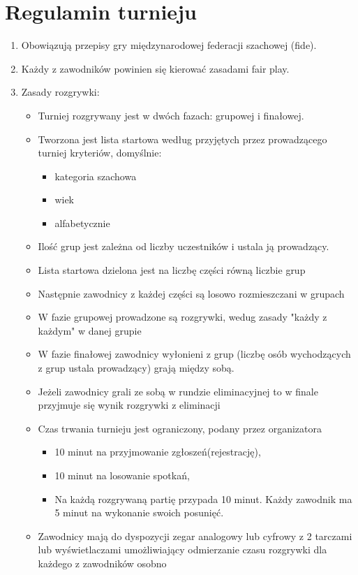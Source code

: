 \section{Regulamin turnieju}
\begin{enumerate}
\item Obowiązują przepisy gry międzynarodowej federacji szachowej (fide).
\item Każdy z zawodników powinien się kierować zasadami fair play.
\item Zasady rozgrywki:
\begin{itemize}
\item Turniej rozgrywany jest w dwóch fazach: grupowej i finałowej.\\
\item Tworzona jest lista startowa według przyjętych przez prowadzącego turniej kryteriów, domyślnie:
\begin{itemize}
\item kategoria szachowa 
\item wiek
\item alfabetycznie
\end{itemize}
\item Ilość grup jest zależna od liczby uczestników i ustala ją prowadzący.
\item Lista startowa dzielona jest na liczbę części równą liczbie grup
\item Następnie zawodnicy z każdej części są losowo rozmieszczani w grupach
\item W fazie grupowej prowadzone są rozgrywki, wedug zasady "każdy z każdym" w danej grupie
\item W fazie finałowej zawodnicy wyłonieni z grup (liczbę osób wychodzących z grup ustala prowadzący) grają między sobą.
\item Jeżeli zawodnicy grali ze sobą w rundzie eliminacyjnej to w finale przyjmuje się wynik rozgrywki z eliminacji
\item Czas trwania turnieju jest ograniczony, podany przez organizatora
\begin{itemize}
\item 10 minut na przyjmowanie zgłoszeń(rejestrację),
\item 10 minut na losowanie spotkań,
\item Na każdą rozgrywaną partię przypada 10 minut. Każdy zawodnik ma 5 minut na wykonanie swoich posunięć.
\end{itemize}
\item Zawodnicy mają do dyspozycji zegar analogowy lub cyfrowy z 2 tarczami lub wyświetlaczami umożliwiający odmierzanie czasu rozgrywki dla każdego z zawodników osobno

\end{itemize}
\end{enumerate}
